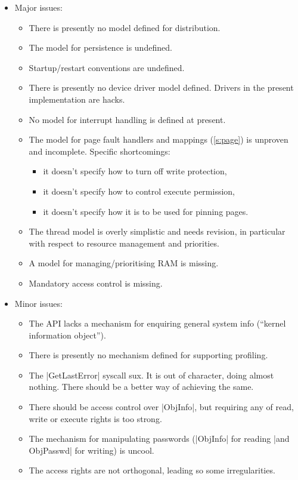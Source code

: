 \documentclass[a4paper,11pt,twoside,dvips]{report}
\begin{document}
\begin{itemize}
\item Major issues:
\begin{itemize}
\item There is presently no model defined for distribution.
\item The model for persistence is undefined.
\item Startup/restart conventions are undefined.
\item There is presently no device driver model defined. Drivers in the
present implementation are hacks.
\item No model for interrupt handling is defined at present.
\item The model for page fault handlers and mappings (\autoref{s:page})
is unproven and incomplete. Specific shortcomings:
\begin{itemize}
\item it doesn't specify how to turn off write protection,
\item it doesn't specify how to control execute permission,
\item it doesn't specify how it is to be used for pinning pages.
\end{itemize}
\item The thread model is overly simplistic and needs revision, in
particular with respect to resource management and priorities.
\item A model for managing/prioritising RAM is missing.
\item Mandatory access control is missing.
\end{itemize}

\item Minor issues:
\begin{itemize}
\item The API lacks a mechanism for enquiring general system info
(``kernel information object'').
\item There is presently no mechanism defined for supporting profiling.
\item The |GetLastError| syscall sux. It is out of character, doing
almost nothing. There should be a better way of achieving the same.
\item There should be access control over |ObjInfo|, but requiring any
  of read, write or execute rights is too strong.
\item The mechanism for manipulating passwords (|ObjInfo| for reading
  |and ObjPasswd| for writing) is uncool.
\item The access rights are not orthogonal, leading so some irregularities.
\end{itemize}
\end{itemize}
\end{document}
